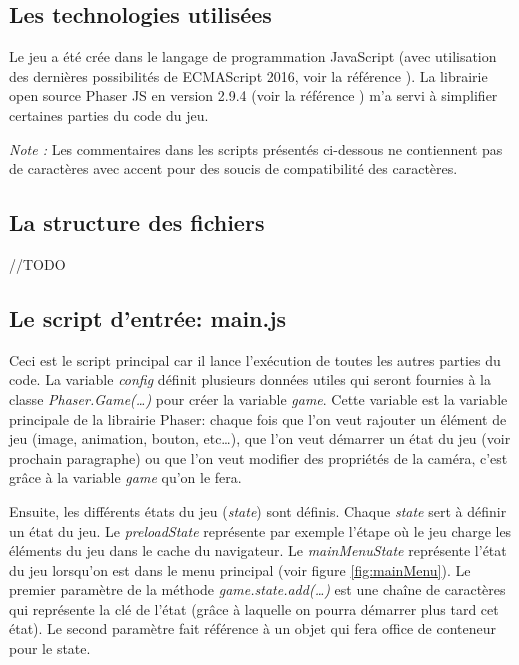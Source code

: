 \documentclass{article}
\begin{document}
        \subsection{Les technologies utilisées}
        Le jeu a été crée dans le langage de programmation JavaScript (avec utilisation des dernières possibilités de ECMAScript 2016, voir la référence \cite{ecma2016}). La librairie open source Phaser JS en version 2.9.4 (voir la référence \cite{phaser}) m'a servi à simplifier certaines parties du code du jeu.
        
        
        \textit{Note : } Les commentaires dans les scripts présentés ci-dessous ne contiennent pas de caractères avec accent pour des soucis de compatibilité des caractères.
        
        
        \subsection{La structure des fichiers}
        //TODO
        
       	
		\subsection{Le script d'entrée: main.js} \label{main.js}
		
		Ceci est le script principal car il lance l'exécution de toutes les autres parties du code.
		La variable \textit{config} définit plusieurs données utiles qui seront fournies à la classe \textit{Phaser.Game(\dots)} pour créer la variable \textit{game}. Cette variable est la variable principale de la librairie Phaser: chaque fois que l'on veut rajouter un élément de jeu (image, animation, bouton, etc\dots), que l'on veut démarrer un état du jeu (voir prochain paragraphe) ou que l'on veut modifier des propriétés de la caméra, c'est grâce à la variable \textit{game} qu'on le fera.
		
		
		Ensuite, les différents états du jeu (\textit{state}) sont définis. Chaque \textit{state} sert à définir un état du jeu. Le \textit{preloadState} représente par exemple l'étape où le jeu charge les éléments du jeu dans le cache du navigateur.
		Le \textit{mainMenuState} représente l'état du jeu lorsqu'on est dans le menu principal (voir figure \ref{fig:mainMenu}).
		Le premier paramètre de la méthode \textit{game.state.add(\dots)} est une chaîne de caractères qui représente la clé de l'état (grâce à laquelle on pourra démarrer plus tard cet état). Le second paramètre fait référence à un objet qui fera office de conteneur pour le state.
		
\end{document}
